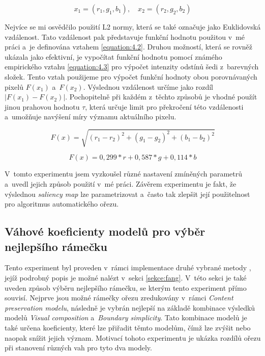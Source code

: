 \begin{equation} \label{equation:4.1}
x_1 = (r_1, g_1, b_1), \quad x_2 = (r_2, g_2, b_2)
\end{equation}

Nejvíce se mi osvědčilo použití L2 normy, která se také označuje jako Euklidovská vzdálenost. Tato vzdálenost pak představuje funkční hodnotu použitou v~mé práci a~je definována vztahem \ref{equation:4.2}. Druhou možností, která se rovněž ukázala jako efektivní, je vypočítat funkční hodnotu pomocí známého empirického vztahu \ref{equation:4.3} pro výpočet intenzity odstínů šedi z~barevných složek. Tento vztah použijeme pro výpočet funkční hodnoty obou porovnávaných pixelů $F(x_1)$ a~$F(x_2)$. Výslednou vzdálenost určíme jako rozdíl $\vert F(x_1)-F(x_2) \vert$. Pochopitelně při každém z~těchto způsobů je vhodné použít jinou prahovou hodnotu $\tau$, která určuje limit pro překročení této vzdálenosti a~umožňuje navýšení míry významu aktuálního pixelu.

\begin{equation} \label{equation:4.2}
F(x) = \sqrt{(r_1-r_2)^2 + (g_1-g_2)^2 + (b_1-b_2)^2}
\end{equation}

\begin{equation} \label{equation:4.3}
F(x) = 0,299*r + 0,587*g + 0,114*b
\end{equation}

V~tomto experimentu jsem vyzkoušel různé nastavení zmíněných parametrů a~uvedl jejich způsob použití v~mé práci. Závěrem experimentu je fakt, že výslednou \emph{saliency map} lze parametrizovat a~často tak zlepšit její použitelnost pro algoritmus automatického ořezu.

\subsection{Váhové koeficienty modelů pro výběr nejlepšího rámečku}
Tento experiment byl proveden v~rámci implementace druhé vybrané metody \cite{Fang2014}, jejíž podrobný popis je možné nalézt v~sekci \ref{sekce:fang}. V~této sekci je také uveden způsob výběru nejlepšího rámečku, se kterým tento experiment přímo souvisí. Nejprve jsou možné rámečky ořezu zredukovány v~rámci \emph{Content preservation modelu}, následně je vybrán nejlepší na základě kombinace výsledků modelů \emph{Visual composition} a~\emph{Boundary simplicity}. Tato kombinace modelů je také určena koeficienty, které lze přiřadit těmto modelům, čímž lze zvýšit nebo naopak snížit jejich význam. Motivací tohoto experimentu je ukázka rozdílů ořezu při stanovení různých vah pro tyto dva modely.

